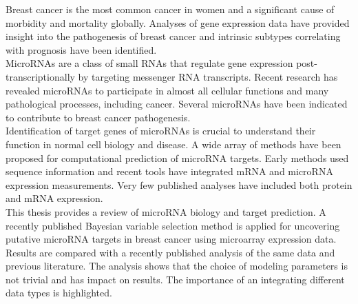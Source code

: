 \documentclass[english,12pt,a4paper,pdftex,elec,utf8]{aaltothesis}
\begin{document}
\begin{abstractpage}[english]

Breast cancer is the most common cancer in women and a significant cause of
morbidity and mortality globally. Analyses of gene expression data have
provided insight into the pathogenesis of breast cancer and  intrinsic subtypes
correlating with prognosis have been identified. \\

MicroRNAs are a class of small RNAs that regulate gene expression post-
transcriptionally by targeting messenger RNA transcripts. Recent research has
revealed microRNAs to participate in almost all cellular functions and many
pathological processes, including cancer. Several microRNAs have been
indicated to contribute to breast cancer pathogenesis. \\

Identification of target genes of microRNAs is crucial to understand their
function in normal cell biology and disease. A wide array of methods have been
proposed for computational prediction of microRNA targets. Early methods used
sequence information and recent tools have integrated mRNA and microRNA
expression measurements. Very few published analyses have included both
protein and mRNA expression. \\

This thesis provides a review of microRNA biology and target prediction. A
recently published Bayesian variable selection method is applied for
uncovering putative microRNA targets in breast cancer using microarray
expression data. Results are compared with a recently published analysis of
the same data and previous literature. The analysis shows that the choice of
modeling parameters is not trivial and has impact on results. The importance
of an integrating different data types is highlighted.

\end{abstractpage}

\newpage
\end{document}
